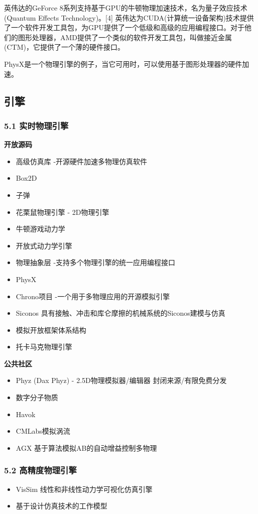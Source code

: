 英伟达的GeForce 8系列支持基于GPU的牛顿物理加速技术，名为量子效应技术(Quantum Effects Technology)。[4] 英伟达为CUDA(计算统一设备架构)技术提供了一个软件开发工具包，为GPU提供了一个低级和高级的应用编程接口。对于他们的图形处理器，AMD提供了一个类似的软件开发工具包，叫做接近金属(CTM)，它提供了一个薄的硬件接口。

PhysX是一个物理引擎的例子，当它可用时，可以使用基于图形处理器的硬件加速。
\subsection{引擎}
\subsubsection{5.1 实时物理引擎}
\textbf{开放源码}
\begin{itemize}
\item 高级仿真库 -开源硬件加速多物理仿真软件
\item Box2D
\item 子弹
\item 花栗鼠物理引擎 - 2D物理引擎
\item 牛顿游戏动力学
\item 开放式动力学引擎
\item 物理抽象层 -支持多个物理引擎的统一应用编程接口
\item PhysX
\item Chrono项目 -一个用于多物理应用的开源模拟引擎
\item Siconos 具有接触、冲击和库仑摩擦的机械系统的Siconos建模与仿真
\item 模拟开放框架体系结构
\item 托卡马克物理引擎
\end{itemize}

\textbf{公共社区}
\begin{itemize}
\item Phyz (Dax Phyz) - 2.5D物理模拟器/编辑器
封闭来源/有限免费分发
\item 数字分子物质
\item Havok
\item CMLabs模拟涡流
\item AGX 基于算法模拟AB的自动增益控制多物理
\end{itemize}
\subsubsection{5.2 高精度物理引擎}
\begin{itemize}
\item VisSim 线性和非线性动力学可视化仿真引擎
\item 基于设计仿真技术的工作模型
\end{itemize}
